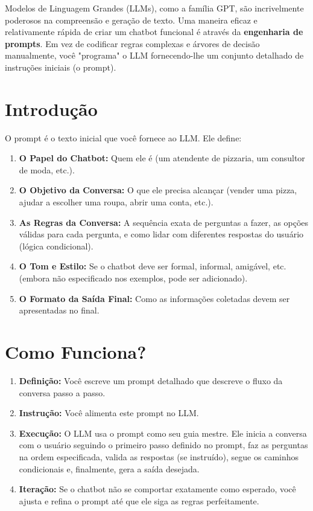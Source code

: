 \documentclass[14pt,a4paper,oneside]{book}
\begin{document}
Modelos de Linguagem Grandes (LLMs), como a família GPT, são incrivelmente poderosos na compreensão e geração de texto. Uma maneira eficaz e relativamente rápida de criar um chatbot funcional é através da \textbf{engenharia de prompts}. Em vez de codificar regras complexas e árvores de decisão manualmente, você "programa" o LLM fornecendo-lhe um conjunto detalhado de instruções iniciais (o prompt).

\section{Introdução}

O prompt é o texto inicial que você fornece ao LLM. Ele define:

\begin{enumerate}
    \item \textbf{O Papel do Chatbot:} Quem ele é (um atendente de pizzaria, um consultor de moda, etc.).
    \item \textbf{O Objetivo da Conversa:} O que ele precisa alcançar (vender uma pizza, ajudar a escolher uma roupa, abrir uma conta, etc.).
    \item \textbf{As Regras da Conversa:} A sequência exata de perguntas a fazer, as opções válidas para cada pergunta, e como lidar com diferentes respostas do usuário (lógica condicional).
    \item \textbf{O Tom e Estilo:} Se o chatbot deve ser formal, informal, amigável, etc. (embora não especificado nos exemplos, pode ser adicionado).
    \item \textbf{O Formato da Saída Final:} Como as informações coletadas devem ser apresentadas no final.
\end{enumerate}

\section*{Como Funciona?}

\begin{enumerate}
    \item \textbf{Definição:} Você escreve um prompt detalhado que descreve o fluxo da conversa passo a passo.
    \item \textbf{Instrução:} Você alimenta este prompt no LLM.
    \item \textbf{Execução:} O LLM usa o prompt como seu guia mestre. Ele inicia a conversa com o usuário seguindo o primeiro passo definido no prompt, faz as perguntas na ordem especificada, valida as respostas (se instruído), segue os caminhos condicionais e, finalmente, gera a saída desejada.
    \item \textbf{Iteração:} Se o chatbot não se comportar exatamente como esperado, você ajusta e refina o prompt até que ele siga as regras perfeitamente.
\end{enumerate}
\end{document}
